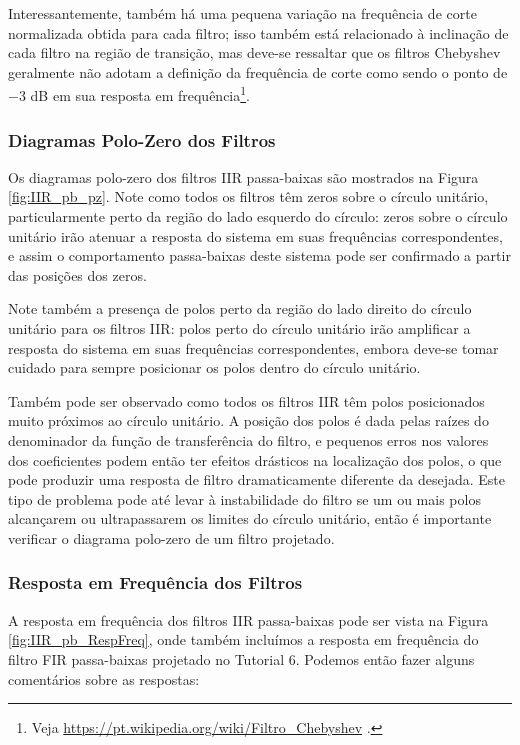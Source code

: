 \documentclass[a4paper,twoside,12pt]{article}
\begin{document}
	Interessantemente, também há uma pequena variação na frequência de corte normalizada obtida para cada filtro; isso também está relacionado à inclinação de cada filtro na região de transição, mas deve-se ressaltar que os filtros Chebyshev geralmente não adotam a definição da frequência de corte como sendo o ponto de $-3$ dB em sua resposta em frequência\footnote{Veja \url{https://pt.wikipedia.org/wiki/Filtro\_Chebyshev} .}.
	
	\subsubsection{Diagramas Polo-Zero dos Filtros}
	
	Os diagramas polo-zero dos filtros IIR passa-baixas são mostrados na Figura \ref{fig:IIR_pb_pz}. Note como todos os filtros têm zeros sobre o círculo unitário, particularmente perto da região do lado esquerdo do círculo: zeros sobre o círculo unitário irão atenuar a resposta do sistema em suas frequências correspondentes, e assim o comportamento passa-baixas deste sistema pode ser confirmado a partir das posições dos zeros.
	
	Note também a presença de polos perto da região do lado direito do círculo unitário para os filtros IIR: polos perto do círculo unitário irão amplificar a resposta do sistema em suas frequências correspondentes, embora deve-se tomar cuidado para sempre posicionar os polos dentro do círculo unitário.
	
	Também pode ser observado como todos os filtros IIR têm polos posicionados muito próximos ao círculo unitário. A posição dos polos é dada pelas raízes do denominador da função de transferência do filtro, e pequenos erros nos valores dos coeficientes podem então ter efeitos drásticos na localização dos polos, o que pode produzir uma resposta de filtro dramaticamente diferente da desejada. Este tipo de problema pode até levar à instabilidade do filtro se um ou mais polos alcançarem ou ultrapassarem os limites do círculo unitário, então é importante verificar o diagrama polo-zero de um filtro projetado.
	
	\subsubsection{Resposta em Frequência dos Filtros}
	
	A resposta em frequência dos filtros IIR passa-baixas pode ser vista na Figura \ref{fig:IIR_pb_RespFreq}, onde também incluímos a resposta em frequência do filtro FIR passa-baixas projetado no Tutorial 6. Podemos então fazer alguns comentários sobre as respostas:
	
\end{document}
